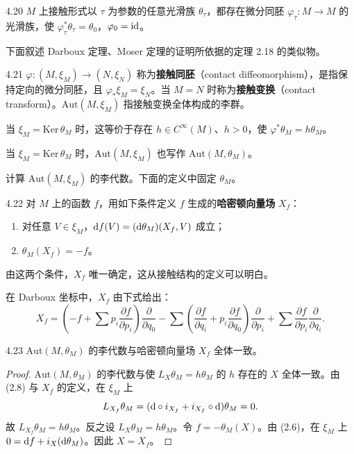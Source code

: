 \begin{theorem}{4.20}
  $M$ 上接触形式以 $\tau$ 为参数的任意光滑族
  $\theta_\tau$，都存在微分同胚 $\varphi_\tau:M\to M$ 的光滑族，使 $\varphi_\tau^*\theta_\tau=\theta_0$，$\varphi_0=\mathrm{id}$。
\end{theorem}

下面叙述 Darboux 定理、Moser 定理的证明所依据的定理 2.18 的类似物。

\begin{definition}{4.21}
  $\varphi:(M,\xi_M)\to(N,\xi_N)$ 称为\textbf{接触同胚}（contact diffeomorphism），是指保持定向的微分同胚，且 $\varphi_*\xi_M=\xi_N$。当 $M=N$ 时称为\textbf{接触变换}（contact transform）。$\mathrm{Aut}(M,\xi_M)$ 指接触变换全体构成的李群。
\end{definition}

当 $\xi_M=\mathrm{Ker}\,\theta_M$ 时，这等价于存在 $h\in C^\infty(M)$、$h>0$，使 $\varphi^*\theta_M=h\theta_M$。

当 $\xi_M=\mathrm{Ker}\,\theta_M$ 时，$\mathrm{Aut}(M,\xi_M)$ 也写作 $\mathrm{Aut}(M,\theta_M)$。

计算 $\mathrm{Aut}(M,\xi_M)$ 的李代数。下面的定义中固定 $\theta_M$。

\begin{definition}{4.22}
  对 $M$ 上的函数 $f$，用如下条件定义 $f$ 生成的\textbf{哈密顿向量场} $X_f$：
  \begin{enumerate}
    \item 对任意 $V\in\xi_M$，$\mathrm{d} f(V)=(\mathrm{d}\theta_M)(X_f,V)$ 成立；
    \item $\theta_M(X_f)=-f$。
  \end{enumerate}
  由这两个条件，$X_f$ 唯一确定，这从接触结构的定义可以明白。
\end{definition}

在 Darboux 坐标中，$X_f$ 由下式给出：
\[
  X_f=\left(-f+\sum p_i\frac{\partial f}{\partial p_i}\right)\frac{\partial}{\partial q_0}-\sum\left(\frac{\partial f}{\partial q_i}+p_i\frac{\partial f}{\partial q_0}\right)\frac{\partial}{\partial p_i}+\sum\frac{\partial f}{\partial p_i}\frac{\partial}{\partial q_i}.
\]

\begin{lemma*}{4.23}
  $\mathrm{Aut}(M,\theta_M)$ 的李代数与哈密顿向量场 $X_f$ 全体一致。
\end{lemma*}
\begin{proof}
  $\mathrm{Aut}(M,\theta_M)$ 的李代数与使 $L_X\theta_M=h\theta_M$ 的 $h$ 存在的 $X$ 全体一致。由 (2.8) 与 $X_f$ 的定义，在 $\xi_M$ 上
  \[
    L_{X_f}\theta_M=(\mathrm{d}\circ i_{X_f}+i_{X_f}\circ\mathrm{d})\theta_M=0.
  \]
  故 $L_{X_f}\theta_M=h\theta_M$。反之设 $L_X\theta_M=h\theta_M$。令 $f=-\theta_M(X)$。由 (2.6)，在 $\xi_M$ 上 $0=\mathrm{d} f+i_X(\mathrm{d}\theta_M)$。因此 $X=X_f$。
\end{proof}

